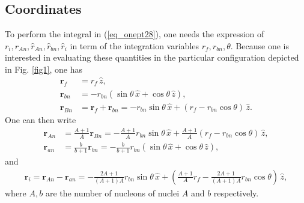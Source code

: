 \subsection{Coordinates}
To perform the integral in (\ref{eq_onept28}), one needs the expression of $r_i,r_{An},\hat r_{An},\hat r_{bn},\hat r_i$ in term of the integration variables $r_f,r_{bn},\theta$. Because one is interested in evaluating these quantities in the particular configuration depicted in Fig. \ref{fig1}, one has
\begin{align}
\mathbf{r}_f&=r_f \,\hat z,\\
\mathbf{r}_{bn}&=-r_{bn}(\sin \theta \,\hat x+ \cos \theta  \,\hat z),\\
\mathbf{r}_{Bn}&=\mathbf{r}_f+\mathbf{r}_{bn}=-r_{bn}\sin \theta \,\hat x+(r_f-r_{bn}\cos \theta)\,\hat z.
\end{align}
One can then write
\begin{align}
\mathbf{r}_{An}&=\frac{A+1}{A}\mathbf{r}_{Bn}=-\frac{A+1}{A}r_{bn}\sin \theta \,\hat x+\frac{A+1}{A}(r_f-r_{bn}\cos \theta)\,\hat z,\\
\mathbf{r}_{an}&=\frac{b}{b+1}\mathbf{r}_{bn}=-\frac{b}{b+1}r_{bn}(\sin \theta \,\hat x+ \cos \theta  \,\hat z),
\end{align}
and
\begin{multline}
\mathbf{r}_i=\mathbf{r}_{An}-\mathbf{r}_{an}=-\frac{2A+1}{(A+1)A}r_{bn}\sin \theta \,\hat x
+\left(\frac{A+1}{A}r_f-\frac{2A+1}{(A+1)A}r_{bn}\cos \theta\right)\,\hat z,
\end{multline}
where $A,b$ are the number of nucleons of nuclei $A$ and $b$ respectively.


